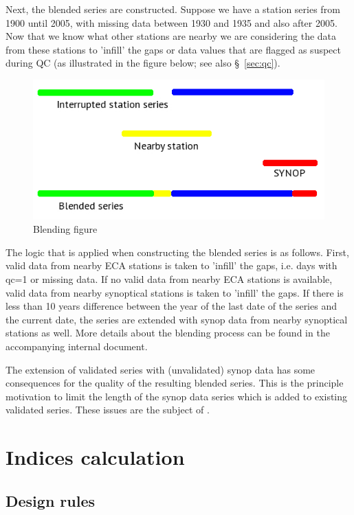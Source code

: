 \documentclass[a4paper,11pt]{article}
\begin{document}
Next, the blended series are constructed. Suppose we have a station
series from 1900 until 2005, with missing data between 1930 and 1935
and also after 2005. Now that we know what other stations are nearby
we are considering the data from these stations to 'infill' the gaps
or data values that are flagged as suspect during QC (as illustrated
in the figure below; see also \S~\ref{sec:qc}).

\begin{figure}[!ht]
\includegraphics[width=\textwidth]{blended_fig_new1.jpg}
\caption{Blending figure}
\label{fig:blend}
\end{figure}

The logic that is applied when constructing the blended series is as
follows. First, valid data from nearby ECA stations is taken to
'infill' the gaps, i.e. days with qc=1 or missing data. If no valid
data from nearby ECA stations is available, valid data from nearby
synoptical stations is taken to 'infill' the gaps. If there is less
than 10 years difference between the year of the last date of the
series and the current date, the series are extended with synop data
from nearby synoptical stations as well. More details about the
blending process can be found in the accompanying internal document.

The extension of validated series with (unvalidated) synop data has
some consequences for the quality of the resulting blended series. This
is the principle motivation to limit the length of the synop data series 
which is added to existing validated series. These issues are the subject
of \citet{vandenbesselaar:12}.


\section{Indices calculation}
\label{sec:indices}

\subsection{Design rules}
\label{sec:indicesrules}
\end{document}
